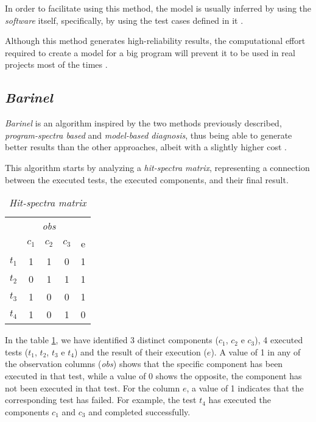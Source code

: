 In order to facilitate using this method, the model is usually inferred by using the \emph{software} itself, specifically, by using the test cases defined in it \cite{Perez2004}.

Although this method generates high-reliability results, the computational effort required to create a model for a big program will prevent it to be used in real projects most of the times \cite{Mayer2008}.

% 
%

\subsection{\emph{Barinel}}

\emph{Barinel} is an algorithm inspired by the two methods previously described, \emph{program-spectra based} and \emph{model-based diagnosis}, thus being able to generate better results than the other approaches, albeit with a slightly higher cost \cite{Abreu2009}.

This algorithm starts by analyzing a \emph{hit-spectra matrix}, representing a connection between the executed tests, the executed components, and their final result.

\begin{table}[H]
  \centering
  \begin{tabular}{c|ccc|c} 
    & \multicolumn{3}{c|}{\textit{obs}} &  \\
    & $c_1$ & $c_2$ & $c_3$ & e \\ 
    \hline
    $t_1$ & 1 & 1 & 0 & 1 \\
    $t_2$ & 0 & 1 & 1 & 1 \\
    $t_3$ & 1 & 0 & 0 & 1 \\
    $t_4$ & 1 & 0 & 1 & 0 \\
  \end{tabular}
  \caption{\emph{Hit-spectra matrix}}
  \label{tab:hit-spectra}
\end{table}


In the table \ref{tab:hit-spectra}, we have identified 3 distinct components ($c_1$, $c_2$ e $c_3$), 4 executed tests ($t_1$, $t_2$, $t_3$ e $t_4$) and the result of their execution ($e$). A value of 1 in any of the observation columns (\emph{obs}) shows that the specific component has been executed in that test, while a value of 0 shows the opposite, the component has not been executed in that test. For the column $e$, a value of 1 indicates that the corresponding test has failed. 
For example, the test $t_4$ has executed the components $c_1$ and $c_3$ and completed successfully.


